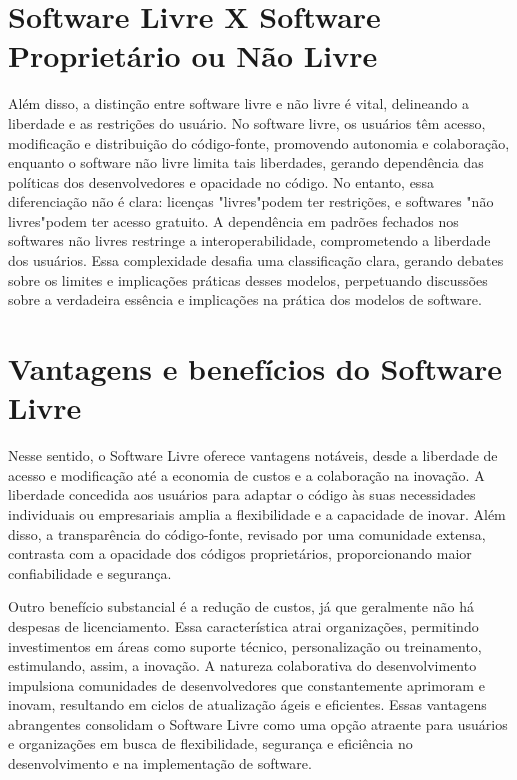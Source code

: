 \documentclass[a4paper, 12pt]{article}
\begin{document}
\section{Software Livre X Software Proprietário ou Não Livre}
Além disso, a distinção entre software livre e não livre\cite{dado3} é vital, delineando a liberdade e as restrições do usuário. No software livre\cite{dado4}, os usuários têm acesso, modificação e distribuição do código-fonte, promovendo autonomia e colaboração, enquanto o software não livre limita tais liberdades, gerando dependência das políticas dos desenvolvedores e opacidade no código. No entanto, essa diferenciação não é clara: licenças "livres"\space podem ter restrições, e softwares "não livres"\space podem ter acesso gratuito. A dependência em padrões fechados nos softwares não livres restringe a interoperabilidade, comprometendo a liberdade dos usuários. Essa complexidade desafia uma classificação clara, gerando debates sobre os limites e implicações práticas desses modelos, perpetuando discussões sobre a verdadeira essência e implicações na prática dos modelos de software.

\section{Vantagens e benefícios do Software Livre}
Nesse sentido, o Software Livre oferece vantagens\cite{dado1} notáveis, desde a liberdade de acesso e modificação até a economia de custos e a colaboração na inovação. A liberdade concedida aos usuários para adaptar o código às suas necessidades individuais ou empresariais amplia a flexibilidade e a capacidade de inovar. Além disso, a transparência do código-fonte, revisado por uma comunidade extensa, contrasta com a opacidade dos códigos proprietários, proporcionando maior confiabilidade e segurança.

Outro benefício substancial é a redução de custos\cite{dado3}, já que geralmente não há despesas de licenciamento. Essa característica atrai organizações, permitindo investimentos em áreas como suporte técnico, personalização ou treinamento, estimulando, assim, a inovação. A natureza colaborativa do desenvolvimento impulsiona comunidades de desenvolvedores que constantemente aprimoram e inovam, resultando em ciclos de atualização ágeis e eficientes. Essas vantagens abrangentes consolidam o Software Livre como uma opção atraente para usuários e organizações em busca de flexibilidade, segurança e eficiência no desenvolvimento e na implementação de software.
\end{document}
